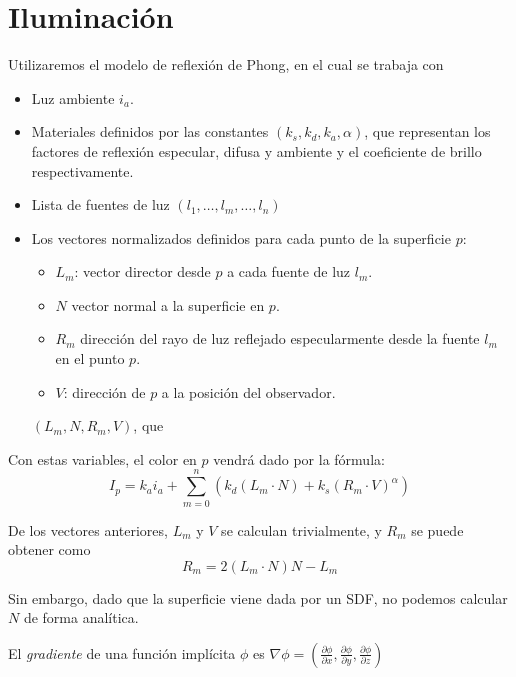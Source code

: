 \section{Iluminación}
Utilizaremos el modelo de reflexión de Phong, en el cual se trabaja con
\begin{itemize}
    \item Luz ambiente $i_a$.
    \item Materiales definidos por las constantes $(k_s, k_d, k_a, \alpha)$, que representan los factores de reflexión especular, difusa y ambiente y el coeficiente de brillo respectivamente.
    \item Lista de fuentes de luz $(l_1, \dots, l_m, \dots, l_n)$
    \item Los vectores normalizados definidos para cada punto de la superficie $p$:
          \begin{itemize}
              \item $L_m$: vector director desde $p$ a cada fuente de luz $l_m$.
              \item $N$ vector normal a la superficie en $p$.
              \item $R_m$ dirección del rayo de luz reflejado especularmente desde la fuente $l_m$ en el punto $p$.
              \item $V$: dirección de $p$ a la posición del observador.
          \end{itemize} $(L_m, N, R_m, V)$, que
\end{itemize}

Con estas variables, el color en $p$ vendrá dado por la fórmula:
\begin{equation*}
    I_p = k_a i_a + \sum_{m=0}^{n} \left(k_d\left(L_m\cdot N\right) + k_s\left(R_m\cdot V\right)^{\alpha} \right)
\end{equation*}

De los vectores anteriores, $L_m$ y $V$ se calculan trivialmente, y $R_m$ se puede obtener como
\begin{equation*}
    R_m = 2(L_m\cdot N)N - L_m
\end{equation*}

Sin embargo, dado que la superficie viene dada por un SDF, no podemos calcular $N$ de forma analítica.

\begin{definicion}
    El \textit{gradiente} de una función implícita $\phi$ es $\nabla\phi = \left(\frac{\partial \phi}{\partial x}, \frac{\partial \phi}{\partial y}, \frac{\partial \phi}{\partial z}\right)$
\end{definicion}

